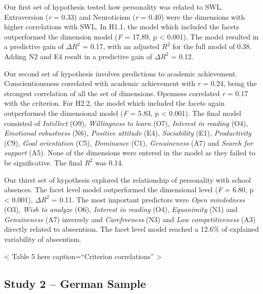 \documentclass[,man,floatsintext]{apa6}
\begin{document}
Our first set of hypothesis tested how personality was related to SWL.
Extraversion (\emph{r} = 0.33) and Neuroticism (\emph{r} = 0.40) were
the dimensions with higher correlations with SWL. In H1.1, the model
which included the facets outperformed the dimension model (\emph{F} =
17.89, p \textless{} 0.001). The model resulted in a predictive gain of
\(\Delta R^2\) = 0.17, with an adjusted \(R^2\) for the full model of
0.38. Adding N2 and E4 result in a predictive gain of \(\Delta R^2\) =
0.12.

Our second set of hypothesis involves predictions to academic
achievement. Conscientiousness correlated with academic achievement with
\emph{r} = 0.24, being the strongest correlation of all the set of
dimensions. Openness correlated \emph{r} = 0.17 with the criterion. For
H2.2, the model which included the facets again outperformed the
dimensional model (\emph{F} = 5.83, p \textless{} 0.001). The final
model consisted of \emph{Intellect} (O9), \emph{Willingness to learn}
(O7), \emph{Interest in reading} (O4), \emph{Emotional robustness} (N6),
\emph{Positive attitude} (E4), \emph{Sociability} (E1),
\emph{Productivity} (C9), \emph{Goal orientation} (C5), \emph{Dominance}
(C1), \emph{Genuineness} (A7) and \emph{Search for support} (A5). None
of the dimensions were entered in the model as they failed to be
significative. The final \(R^2\) was 0.14.

Our thirst set of hypothesis explored the relationship of personality
with school absences. The facet level model outperformed the dimensional
level (\emph{F} = 6.80, p \textless{} 0.001), \(\Delta R^2\) = 0.11. The
most important predictors were \emph{Open mindedness} (O3), \emph{Wish
to analyze} (O6), \emph{Interest in reading} (O4), \emph{Equanimity}
(N1) and \emph{Genuineness} (A7) inversely and \emph{Carefreeness} (N3)
and \emph{Low competitiveness} (A3) directly related to abseentism. The
facet level model reached a 12.6\% of explained variability of
abseentism.

\vspace{5mm}

\textless{} Table 5 here caption=\enquote{Criterion correlations}
\textgreater{}

\vspace{5mm}

\subsection{Study 2 -- German Sample}\label{study-2-german-sample}
\end{document}
